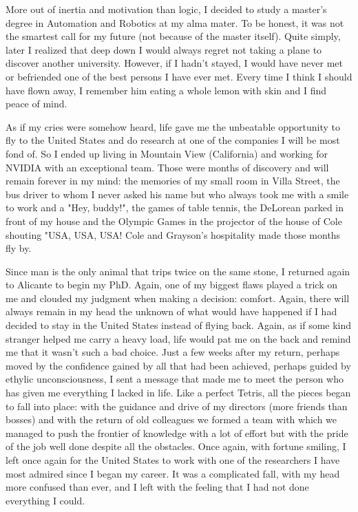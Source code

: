 More out of inertia and motivation than logic, I decided to study a master's degree in Automation and Robotics at my alma mater. To be honest, it was not the smartest call for my future (not because of the master itself). Quite simply, later I realized that deep down I would always regret not taking a plane to discover another university. However, if I hadn't stayed, I would have never met or befriended one of the best persons I have ever met. Every time I think I should have flown away, I remember him eating a whole lemon with skin and I find peace of mind.

As if my cries were somehow heard, life gave me the unbeatable opportunity to fly to the United States and do research at one of the companies I will be most fond of. So I ended up living in Mountain View (California) and working for NVIDIA with an exceptional team. Those were months of discovery and will remain forever in my mind: the memories of my small room in Villa Street, the bus driver to whom I never asked his name but who always took me with a smile to work and a "Hey, buddy!", the games of table tennis, the DeLorean parked in front of my house and the Olympic Games in the projector of the house of Cole shouting "USA, USA, USA! Cole and Grayson's hospitality made those months fly by.

Since man is the only animal that trips twice on the same stone, I returned again to Alicante to begin my PhD. Again, one of my biggest flaws played a trick on me and clouded my judgment when making a decision: comfort. Again, there will always remain in my head the unknown of what would have happened if I had decided to stay in the United States instead of flying back. Again, as if some kind stranger helped me carry a heavy load, life would pat me on the back and remind me that it wasn't such a bad choice. Just a few weeks after my return, perhaps moved by the confidence gained by all that had been achieved, perhaps guided by ethylic unconsciousness, I sent a message that made me to meet the person who has given me everything I lacked in life. Like a perfect Tetris, all the pieces began to fall into place: with the guidance and drive of my directors (more friends than bosses) and with the return of old colleagues we formed a team with which we managed to push the frontier of knowledge with a lot of effort but with the pride of the job well done despite all the obstacles. Once again, with fortune smiling, I left once again for the United States to work with one of the researchers I have most admired since I began my career. It was a complicated fall, with my head more confused than ever, and I left with the feeling that I had not done everything I could.

